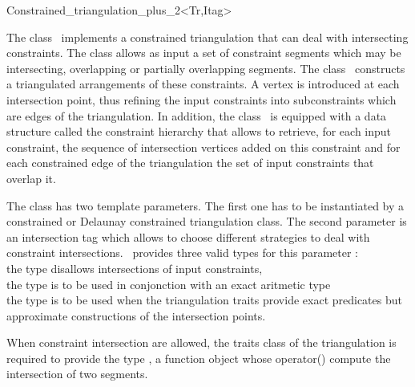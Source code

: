 

\begin{ccRefClass}{Constrained_triangulation_plus_2<Tr,Itag>}  %


The class \ccRefName\ implements a constrained triangulation that 
can deal with intersecting constraints. 
The class allows as input a set of constraint segments which may be
intersecting, overlapping or partially
overlapping segments. 
The class \ccRefName\ constructs a triangulated arrangements 
of these constraints.
A vertex is introduced at each intersection point,
thus refining the input constraints into subconstraints
which are edges of the triangulation.
In addition, the class \ccRefName\ is equipped
with a data structure called  the constraint hierarchy that
 allows to retrieve, 
for each input constraint, the 
sequence of intersection vertices added on this constraint
and for each constrained edge of the
triangulation the set of input constraints that overlap it.

The class has two template parameters.  The first one has to be
instantiated by a constrained or Delaunay constrained triangulation
class. The second parameter is an intersection tag
 which allows to choose different
strategies to deal with constraint intersections. 
\cgal\ provides three valid types for this parameter : \\
the type  disallows intersections of
 input constraints,\\
the type  is to be used in conjonction
with an exact aritmetic type \\
the type  is to be used when the triangulation traits
provide exact predicates but approximate constructions of the
intersection points.

When constraint intersection are allowed, the traits class of the
triangulation is required to provide the type
,  a function object whose operator()
compute the intersection of two segments.



\end{ccRefClass}
